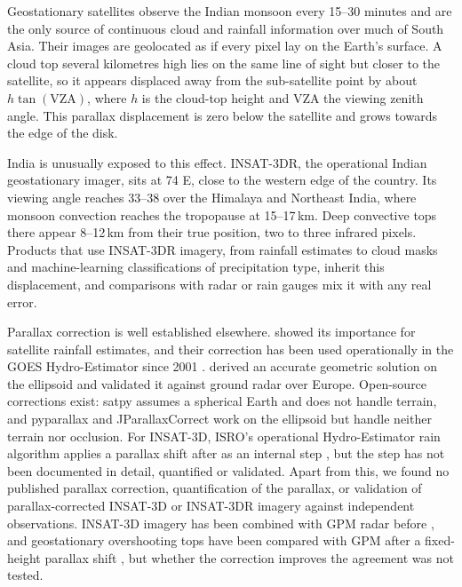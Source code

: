 \introduction
\label{sec:introduction}

Geostationary satellites observe the Indian monsoon every 15--30 minutes and are the only source of continuous cloud and rainfall information over much of South Asia. Their images are geolocated as if every pixel lay on the Earth's surface. A cloud top several kilometres high lies on the same line of sight but closer to the satellite, so it appears displaced away from the sub-satellite point by about $h\tan(\mathrm{VZA})$, where $h$ is the cloud-top height and VZA the viewing zenith angle. This parallax displacement is zero below the satellite and grows towards the edge of the disk.

India is unusually exposed to this effect. INSAT-3DR, the operational Indian geostationary imager, sits at 74\,\textdegree\,E, close to the western edge of the country. Its viewing angle reaches 33--38\textdegree{} over the Himalaya and Northeast India, where monsoon convection reaches the tropopause at 15--17\,km. Deep convective tops there appear 8--12\,km from their true position, two to three infrared pixels. Products that use INSAT-3DR imagery, from rainfall estimates to cloud masks and machine-learning classifications of precipitation type, inherit this displacement, and comparisons with radar or rain gauges mix it with any real error.

Parallax correction is well established elsewhere. \citet{vicente2002} showed its importance for satellite rainfall estimates, and their correction has been used operationally in the GOES Hydro-Estimator since 2001 \citep{scofield2003}. \citet{bielinski2020} derived an accurate geometric solution on the ellipsoid and validated it against ground radar over Europe. Open-source corrections exist: satpy \citep{raspaud2018,satpy_parallax} assumes a spherical Earth and does not handle terrain, and pyparallax \citep{pyparallax} and JParallaxCorrect \citep{tsujino2026} work on the ellipsoid but handle neither terrain nor occlusion. For INSAT-3D, ISRO's operational Hydro-Estimator rain algorithm applies a parallax shift after \citet{vicente2002} as an internal step \citep{sac2015atbd,malhan2022}, but the step has not been documented in detail, quantified or validated. Apart from this, we found no published parallax correction, quantification of the parallax, or validation of parallax-corrected INSAT-3D or INSAT-3DR imagery against independent observations. INSAT-3D imagery has been combined with GPM radar before \citep{mishra2023}, and geostationary overshooting tops have been compared with GPM after a fixed-height parallax shift \citep{sun2024}, but whether the correction improves the agreement was not tested.

